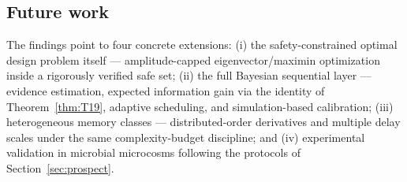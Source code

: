 \subsection{Future work}

The findings point to four concrete extensions: (i) the safety-constrained optimal design problem itself --- amplitude-capped eigenvector/maximin optimization inside a rigorously verified safe set; (ii) the full Bayesian sequential layer --- evidence estimation, expected information gain via the identity of Theorem~\ref{thm:T19}, adaptive scheduling, and simulation-based calibration; (iii) heterogeneous memory classes --- distributed-order derivatives and multiple delay scales under the same complexity-budget discipline; and (iv) experimental validation in microbial microcosms following the protocols of Section~\ref{sec:prospect}.
